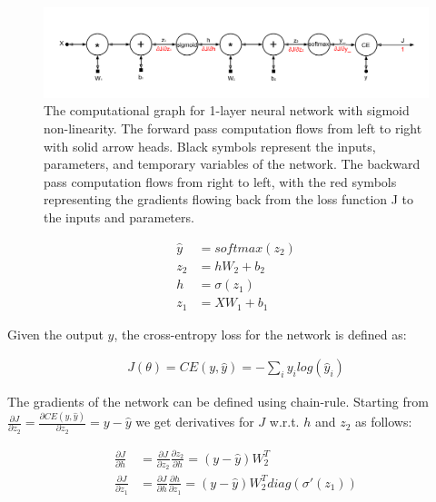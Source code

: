\documentclass[11pt]{article}
\begin{document}
\begin{figure}
  \centering
  \includegraphics[width=\textwidth]{1-layer-network-forward-backward.pdf}

  \caption{The computational graph for 1-layer neural network with sigmoid non-linearity. The forward pass computation flows from left to right with solid arrow heads. Black symbols represent the inputs, parameters, and temporary variables of the network. The backward pass computation flows from right to left, with the red symbols representing the gradients flowing back from the loss function J to the inputs and parameters.}
  \label{fig:nn-computation-graph}
\end{figure}

\begin{equation*}
  \label{eq:forward-pass}
  \begin{split}
    \hat{y} &= softmax(z_{2}) \\
    z_{2} &= hW_{2} + b_{2} \\
    h &= \sigma(z_{1}) \\
    z_{1} &= XW_{1} + b_{1}
  \end{split}
\end{equation*}

Given the output $\hat{y}$, the cross-entropy loss for the network is defined as:

\begin{equation*}
  \label{eq:CE-loss}
  \begin{split}
    J(\theta) = CE(y, \hat{y}) = - \sum_{i} y_{i} log(\hat{y}_{i})
  \end{split}
\end{equation*}

The gradients of the network can be defined using chain-rule. Starting from $\frac{\partial J}{\partial z_{2}} = \frac{\partial CE(y, \hat{y})}{\partial z_{2}} = y - \hat{y}$ we get derivatives for $J$ w.r.t. $h$ and $z_{2}$ as follows:

\begin{equation*}
  \label{eq:temp-grads}
  \begin{split}
    \frac{\partial J}{\partial h} &= \frac{\partial J}{\partial z_{2}}\frac{\partial z_{2}}{\partial h} = (y - \hat{y}) W_{2}^{T}
    \\
    \frac{\partial J}{\partial z_{1}} &= \frac{\partial J}{\partial h}\frac{\partial h}{\partial z_{1}} = (y - \hat{y}) W_{2}^{T} diag(\sigma'(z_{1}))
  \end{split}
\end{equation*}
\end{document}
